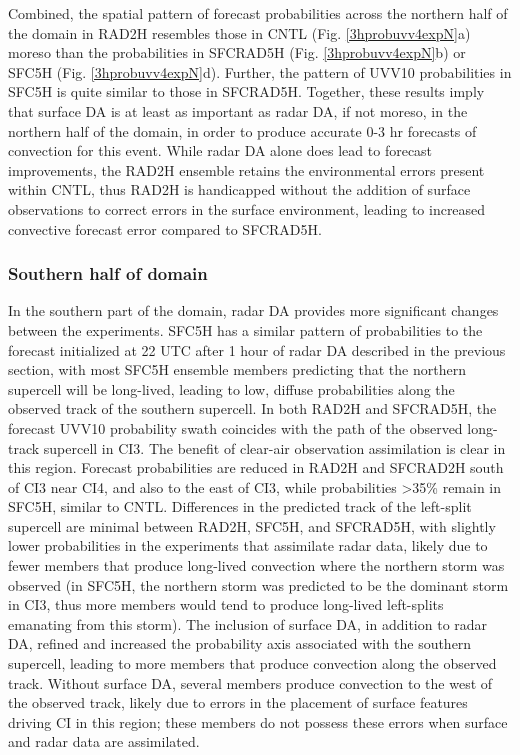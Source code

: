Combined, the spatial pattern of forecast probabilities across the northern half of the domain in RAD2H resembles those in CNTL (Fig. \ref{3hprobuvv4expN}a) moreso than the probabilities in SFCRAD5H (Fig. \ref{3hprobuvv4expN}b) or SFC5H (Fig. \ref{3hprobuvv4expN}d). Further, the pattern of UVV10 probabilities in SFC5H is quite similar to those in SFCRAD5H. Together, these results imply that surface DA is at least as important as radar DA, if not moreso, in the northern half of the domain, in order to produce accurate 0-3 hr forecasts of convection for this event. While radar DA alone does lead to forecast improvements, the RAD2H ensemble retains the environmental errors present within CNTL, thus RAD2H is handicapped without the addition of surface observations to correct errors in the surface environment, leading to increased convective forecast error compared to SFCRAD5H.

\subsubsection{Southern half of domain}
In the southern part of the domain, radar DA provides more significant changes between the experiments. SFC5H has a similar pattern of probabilities to the forecast initialized at 22 UTC after 1 hour of radar DA described in the previous section, with most SFC5H ensemble members predicting that the northern supercell will be long-lived, leading to low, diffuse probabilities along the observed track of the southern supercell. In both RAD2H and SFCRAD5H, the forecast UVV10 probability swath coincides with the path of the observed long-track supercell in CI3. The benefit of clear-air observation assimilation is clear in this region. Forecast probabilities are reduced in RAD2H and SFCRAD2H south of CI3 near CI4, and also to the east of CI3, while probabilities \textgreater 35\% remain in SFC5H, similar to CNTL. Differences in the predicted track of the left-split supercell are minimal between RAD2H, SFC5H, and SFCRAD5H, with slightly lower probabilities in the experiments that assimilate radar data, likely due to fewer members that produce long-lived convection where the northern storm was observed (in SFC5H, the northern storm was predicted to be the dominant storm in CI3, thus more members would tend to produce long-lived left-splits emanating from this storm). The inclusion of surface DA, in addition to radar DA, refined and increased the probability axis associated with the southern supercell, leading to more members that produce convection along the observed track. Without surface DA, several members produce convection to the west of the observed track, likely due to errors in the placement of surface features driving CI in this region; these members do not possess these errors when surface and radar data are assimilated.

